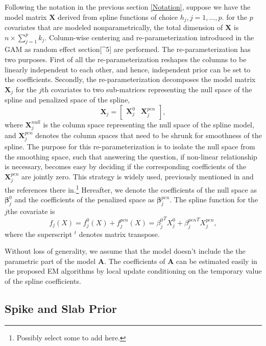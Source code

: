 \documentclass[AMA,STIX1COL,]{WileyNJD-v2}
\begin{document}
Following the notation in the previous section \ref{Notation}, suppose
we have the model matrix \(\boldsymbol{X}\) derived from spline
functions of choice \(h_j, j = 1, \dots, p.\) for the \(p\) covariates
that are modeled nonparametrically, the total dimension of
\(\boldsymbol{X}\) is \(n \times \sum\limits_{j=1}^p k_j\). Column-wise
centering and re-parameterization introduced in the GAM as random effect
section{[}\^{}5{]} are performed. The re-parameterization has two
purposes. First of all the re-parameterization reshapes the columns to
be linearly independent to each other, and hence, independent prior can
be set to the coefficients. Secondly, the re-parameterization decomposes
the model matrix \(\boldsymbol{X}_j\) for the \(j\)th covariates to two
sub-matrices representing the null space of the spline and penalized
space of the spline, \[
\boldsymbol{X}_j = \begin{bmatrix}
\boldsymbol{X}_j^{0} & \boldsymbol{X}_j^{pen}
\end{bmatrix},
\] where \(\boldsymbol{X}_j^{null}\) is the column space representing
the null space of the spline model, and \(\boldsymbol{X}_j^{pen}\)
denotes the column spaces that need to be shrunk for smoothness of the
spline. The purpose for this re-parameterization is to isolate the null
space from the smoothing space, such that answering the question, if
non-linear relationship is necessary, becomes easy by deciding if the
corresponding coefficients of the \(\boldsymbol{X}_j^{pen}\) are jointly
zero. This strategy is widely used, previously mentioned in
\citet{Scheipl2012} and the references there in.\footnote{Possibly
  select some to add here.} Hereafter, we denote the coefficients of the
null space as \(\boldsymbol{\beta}^{0}_j\) and the coefficients of the
penalized space as \(\boldsymbol{\beta}^{pen}_j\). The spline function
for the \(j\)the covariate is \[
f_j(X) = f_j^0(X) + f_j^{pen}(X) = {\beta_j^0}^T X_j^0 + {\beta_j^{pen}}^T X_j^{pen},
\] where the superscript \(^t\) denotes matrix transpose.

Without loss of generality, we assume that the model doesn't include the
the parametric part of the model \(\boldsymbol{A}\). The coefficients of
\(\boldsymbol{A}\) can be estimated easily in the proposed EM algorithms
by local update conditioning on the temporary value of the spline
coefficients.

\hypertarget{spike-and-slab-prior}{%
\subsection{Spike and Slab Prior}\label{spike-and-slab-prior}}
\end{document}
